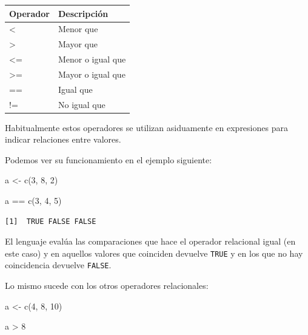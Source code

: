 \documentclass[
  spanish,
  a4paper,
]{scrbook}
\newenvironment{Shaded}{\begin{snugshade}}{\end{snugshade}}
\newcommand{\DecValTok}[1]{\textcolor[rgb]{0.68,0.00,0.00}{#1}}
\newcommand{\FunctionTok}[1]{\textcolor[rgb]{0.28,0.35,0.67}{#1}}
\newcommand{\NormalTok}[1]{\textcolor[rgb]{0.00,0.23,0.31}{#1}}
\newcommand{\OtherTok}[1]{\textcolor[rgb]{0.00,0.23,0.31}{#1}}
\newcommand{\SpecialCharTok}[1]{\textcolor[rgb]{0.37,0.37,0.37}{#1}}
\newcounter{none} %
\begin{document}
{\def\LTcaptype{none} %
\begin{longtable}[]{@{}ll@{}}
\toprule\noalign{}
Operador & Descripción \\
\midrule\noalign{}
\endhead
\bottomrule\noalign{}
\endlastfoot
\textless{} & Menor que \\
\textgreater{} & Mayor que \\
\textless= & Menor o igual que \\
\textgreater= & Mayor o igual que \\
== & Igual que \\
!= & No igual que \\
\end{longtable}
}

Habitualmente estos operadores se utilizan asiduamente en expresiones
para indicar relaciones entre valores.

Podemos ver su funcionamiento en el ejemplo siguiente:

\begin{Shaded}
\begin{Highlighting}[]
\NormalTok{a }\OtherTok{\textless{}{-}} \FunctionTok{c}\NormalTok{(}\DecValTok{3}\NormalTok{, }\DecValTok{8}\NormalTok{, }\DecValTok{2}\NormalTok{)}

\NormalTok{a }\SpecialCharTok{==} \FunctionTok{c}\NormalTok{(}\DecValTok{3}\NormalTok{, }\DecValTok{4}\NormalTok{, }\DecValTok{5}\NormalTok{)}
\end{Highlighting}
\end{Shaded}

\begin{verbatim}
[1]  TRUE FALSE FALSE
\end{verbatim}

El lenguaje evalúa las comparaciones que hace el operador relacional
igual (en este caso) y en aquellos valores que coinciden devuelve
\texttt{TRUE} y en los que no hay coincidencia devuelve \texttt{FALSE}.

Lo mismo sucede con los otros operadores relacionales:

\begin{Shaded}
\begin{Highlighting}[]
\NormalTok{a }\OtherTok{\textless{}{-}} \FunctionTok{c}\NormalTok{(}\DecValTok{4}\NormalTok{, }\DecValTok{8}\NormalTok{, }\DecValTok{10}\NormalTok{)}

\NormalTok{a }\SpecialCharTok{\textgreater{}} \DecValTok{8}
\end{Highlighting}
\end{Shaded}
\end{document}
